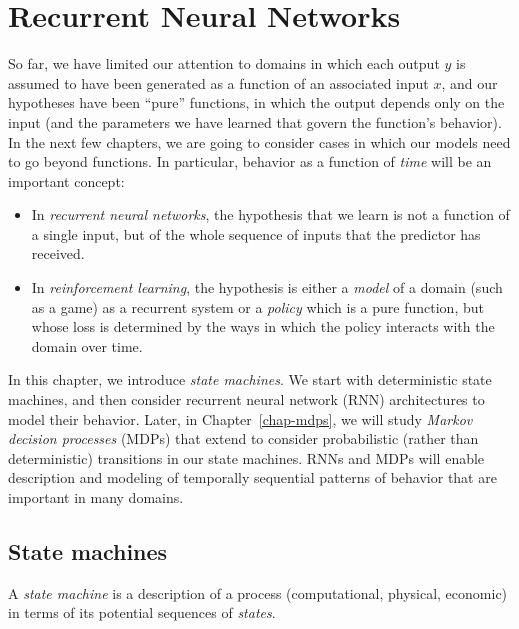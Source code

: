 \chapter{Recurrent Neural Networks}
\label{chap-rnn}

So far, we have limited our attention to domains in which each output
$y$ is assumed to have been generated as a function of an associated
input $x$, and our hypotheses have been ``pure'' functions, in which
the output depends only on the input (and the parameters we have
learned that govern the function's behavior).  In the next few
chapters, we are going to consider cases in which our models need to
go beyond functions.  In particular, behavior as a function of {\em
    time} will be an important concept:
\begin{itemize}
  \item In {\em recurrent neural networks}, the hypothesis that we learn is not a function of a single
        input, but of the whole sequence of inputs that the predictor has
        received.
  \item In {\em reinforcement learning},
        the hypothesis is either a {\em model} of a domain (such as a game)
        as a recurrent system or a {\em policy} which is a pure function,
        but whose loss is determined by the ways in which the policy
        interacts with the domain over time.
\end{itemize}

In this chapter, we introduce {\em state machines}.
We start with deterministic state machines, and then consider
recurrent neural network (RNN) architectures to model their behavior.
Later, in Chapter~\ref{chap-mdps}, we will study {\em Markov decision
    processes} (MDPs) that extend to consider probabilistic (rather than
deterministic) transitions in our state machines.
RNNs and MDPs will enable description and modeling of temporally
sequential patterns of behavior that are important in many domains.


\section{State machines}
\label{sec-state_machines}

A {\em state machine}   is a description of a
process (computational, physical, economic) in terms of its potential
sequences of {\em states}.

